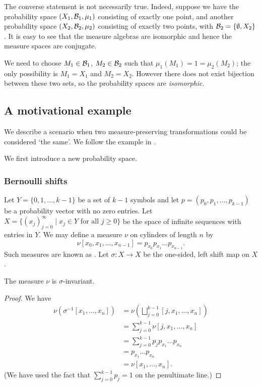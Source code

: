 The converse statement is not necessarily true. Indeed, suppose we have the probability space $(X_1, \mathcal{B}_1, \mu_1)$ consisting of exactly one point, and another probability space $(X_2, \mathcal{B}_2, \mu_2)$ consisting of exactly two points, with $\mathcal{B}_2 = \{\emptyset, X_2\}$. It is easy to see that the measure algebras are isomorphic and hence the measure spaces are conjugate.

We need to choose $M_1 \in \mathcal{B}_1$, $M_2 \in \mathcal{B}_2$ such that $\mu_1(M_1) = 1 = \mu_2(M_2)$; the only possibility is $M_1 = X_1$ and $M_2 = X_2$. However there does not exist bijection between these two sets, so the probability spaces are \emph{isomorphic}.

\subsection{A motivational example}
We describe a scenario when two measure-preserving transformations could be considered `the same'. We follow the example in \cite[p58]{walters:intro-to-ergodic-theory}.

We first introduce a new probability space.

\begin{comment}
Let $Y = \{0, 1\}$ and let $(p_0, p_1)$ be a probability vector with no zero entries. Then $(Y, 2^Y, \nu)$ is a measure space, with measure $\nu$ defined by $\nu(y) = p_y$ for $y \in Y$. Now let $X = \{(x_j)_{j = 0}^\infty \mid x_j \in Y\}$, the space of infinite sequences with entries in $Y = \{0, 1\}$.
\end{comment}
\subsubsection{Bernoulli shifts}
Let $Y = \{0, 1, \dots, k - 1\}$ be a set of $k - 1$ symbols and let $p = (p_0, p_1, \dots, p_{k - 1})$ be a probability vector with no zero entries. Let $X = \{(x_j)_{j = 0}^\infty \mid x_j \in Y \text{ for all } j \geq 0\}$ be the space of infinite sequences with entries in $Y$. We may define a measure $\nu$ on cylinders of length $n$ by
\[
	\nu[x_0, x_1, \dots, x_{n - 1}] = p_{x_0} p_{x_1} \dots p_{x_{n - 1}}.
\]
Such measures are known as . Let $\sigma : X \to X$ be the one-sided, left shift map on $X$.

\begin{proposition}
	The measure $\nu$ is $\sigma$-invariant.
	\begin{proof}
		We have
		\begin{align*}
			\nu(\sigma^{-1}[x_1, \dots, x_n]) &= \nu\left(\bigsqcup_{j = 0}^{k - 1}{[j, x_1, \dots, x_n]}\right) \\
				&= \sum_{j = 0}^{k - 1}{\nu[j, x_1, \dots, x_n]} \\
				&= \sum_{j = 0}^{k - 1}{p_j p_{x_1} \dots p_{x_n}} \\
				&= p_{x_1} \dots p_{x_n} \\
				&= \nu[x_1, \dots, x_n].
		\end{align*}
		(We have used the fact that $\sum_{j = 0}^{k - 1}{p_j} = 1$ on the penultimate line.)
	\end{proof}
\end{proposition}

